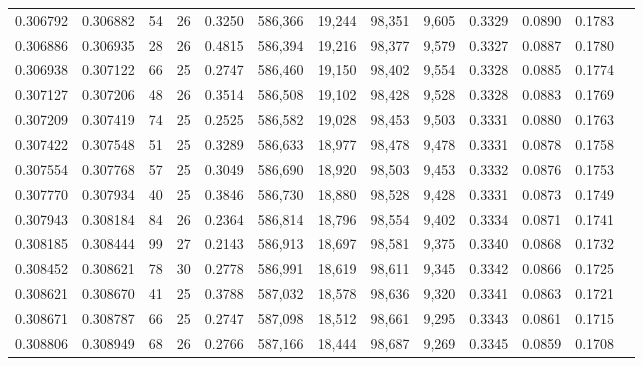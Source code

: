 \begin{tabular}{rrrrrrrrrrrrr}
0.306792 & 0.306882 &  54 &  26 &                                     0.3250 & 586,366 &  19,244 &  98,351 &   9,605 & 0.3329 & 0.0890 & 0.1783 \\
0.306886 & 0.306935 &  28 &  26 &                                     0.4815 & 586,394 &  19,216 &  98,377 &   9,579 & 0.3327 & 0.0887 & 0.1780 \\
0.306938 & 0.307122 &  66 &  25 &                                     0.2747 & 586,460 &  19,150 &  98,402 &   9,554 & 0.3328 & 0.0885 & 0.1774 \\
0.307127 & 0.307206 &  48 &  26 &                                     0.3514 & 586,508 &  19,102 &  98,428 &   9,528 & 0.3328 & 0.0883 & 0.1769 \\
0.307209 & 0.307419 &  74 &  25 &                                     0.2525 & 586,582 &  19,028 &  98,453 &   9,503 & 0.3331 & 0.0880 & 0.1763 \\
0.307422 & 0.307548 &  51 &  25 &                                     0.3289 & 586,633 &  18,977 &  98,478 &   9,478 & 0.3331 & 0.0878 & 0.1758 \\
0.307554 & 0.307768 &  57 &  25 &                                     0.3049 & 586,690 &  18,920 &  98,503 &   9,453 & 0.3332 & 0.0876 & 0.1753 \\
0.307770 & 0.307934 &  40 &  25 &                                     0.3846 & 586,730 &  18,880 &  98,528 &   9,428 & 0.3331 & 0.0873 & 0.1749 \\
0.307943 & 0.308184 &  84 &  26 &                                     0.2364 & 586,814 &  18,796 &  98,554 &   9,402 & 0.3334 & 0.0871 & 0.1741 \\
0.308185 & 0.308444 &  99 &  27 &                                     0.2143 & 586,913 &  18,697 &  98,581 &   9,375 & 0.3340 & 0.0868 & 0.1732 \\
0.308452 & 0.308621 &  78 &  30 &                                     0.2778 & 586,991 &  18,619 &  98,611 &   9,345 & 0.3342 & 0.0866 & 0.1725 \\
0.308621 & 0.308670 &  41 &  25 &                                     0.3788 & 587,032 &  18,578 &  98,636 &   9,320 & 0.3341 & 0.0863 & 0.1721 \\
0.308671 & 0.308787 &  66 &  25 &                                     0.2747 & 587,098 &  18,512 &  98,661 &   9,295 & 0.3343 & 0.0861 & 0.1715 \\
0.308806 & 0.308949 &  68 &  26 &                                     0.2766 & 587,166 &  18,444 &  98,687 &   9,269 & 0.3345 & 0.0859 & 0.1708 \\

\end{tabular}
